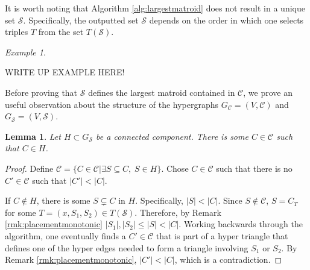 \documentclass[11pt]{article}
\newcommand{\sC}{\mathscr{C}}
\newcommand{\cC}{\mathcal{C}}
\newcommand{\sS}{\mathscr{S}}
\newtheorem{lem}[thm]{Lemma}
\theoremstyle{remark}
\newtheorem{eg}[thm]{Example}
\theoremstyle{definition}
\begin{document}
It is worth noting that Algorithm \ref{alg:largestmatroid} does not result in a unique set $\sS$. Specifically, the outputted set $\sS$ depends on the order in which one selects triples $T$ from the set $T(\sS)$. 

\begin{eg} \label{eg:ordermatters}

WRITE UP EXAMPLE HERE!
    
\end{eg}

Before proving that $\sS$ defines the largest matroid contained in $\sC$, we prove an useful observation about the structure of the hypergraphs $G_\sC = (V, \sC)$ and $G_\sS = (V, \sS)$.

\begin{lem}\label{res:orginaledgeineachcc}
    Let $H \subset G_\sS$ be a connected component. There is some $C \in \sC$ such that $C \in H$.
\end{lem}
\begin{proof}
    Define $\cC  = \{C \in \sC | \exists S \subseteq C, \; S\in  H\}$. Chose $C \in \cC$ such that there is no $C' \in \cC$ such that $|C'| < |C|$.

    If $C \not \in H$, there is some $S \subsetneq C$ in $H$. Specifically, $|S| < |C|$. Since $S \not \in \sC$, $S = C_T$ for some $T = (x, S_1, S_2) \in T(\sS)$. Therefore, by Remark \ref{rmk:placementmonotonic} $|S_1|, |S_2| \leq |S| < |C|$. Working backwards through the algorithm, one eventually finds a $C' \in \sC$ that is part of a hyper triangle that defines one of the hyper edges needed to form a triangle involving $S_1$ or $S_2$. By Remark \ref{rmk:placementmonotonic}, $|C'| < |C|$, which is a contradiction.
\end{proof}
\end{document}
